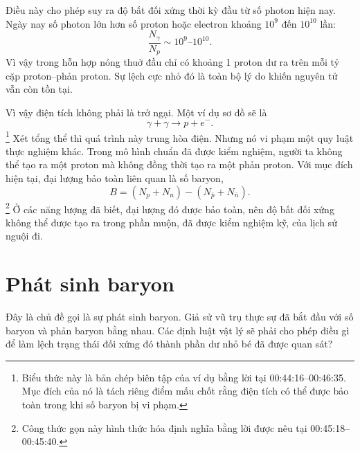 Điều này cho phép suy ra độ bất đối xứng thời kỳ đầu từ số photon hiện nay. Ngày nay số photon lớn hơn số proton hoặc electron khoảng \(10^9\) đến \(10^{10}\) lần:
\[
\frac{N_\gamma}{N_p} \sim 10^9\text{--}10^{10}.
\]
Vì vậy trong hỗn hợp nóng thuở đầu chỉ có khoảng 1 proton dư ra trên mỗi tỷ cặp proton--phản proton. Sự lệch cực nhỏ đó là toàn bộ lý do khiến nguyên tử vẫn còn tồn tại.

\begin{classroomqa}
\end{classroomqa}

Vì vậy điện tích không phải là trở ngại. Một ví dụ sơ đồ sẽ là
\[
\gamma + \gamma \to p + e^-.
\]\footnote{Biểu thức này là bản chép biên tập của ví dụ bằng lời tại 00:44:16--00:46:35. Mục đích của nó là tách riêng điểm mấu chốt rằng điện tích có thể được bảo toàn trong khi số baryon bị vi phạm.}
Xét tổng thể thì quá trình này trung hòa điện. Nhưng nó vi phạm một quy luật thực nghiệm khác. Trong mô hình chuẩn đã được kiểm nghiệm, người ta không thể tạo ra một proton mà không đồng thời tạo ra một phản proton. Với mục đích hiện tại, đại lượng bảo toàn liên quan là số baryon,
\[
B=(N_p+N_n)-(N_{\bar p}+N_{\bar n}).
\]\footnote{Công thức gọn này hình thức hóa định nghĩa bằng lời được nêu tại 00:45:18--00:45:40.}
Ở các năng lượng đã biết, đại lượng đó được bảo toàn, nên độ bất đối xứng không thể được tạo ra trong phần muộn, đã được kiểm nghiệm kỹ, của lịch sử nguội đi.

\section{Phát sinh baryon}

Đây là chủ đề gọi là sự phát sinh baryon. Giả sử vũ trụ thực sự đã bắt đầu với số baryon và phản baryon bằng nhau. Các định luật vật lý sẽ phải cho phép điều gì để làm lệch trạng thái đối xứng đó thành phần dư nhỏ bé đã được quan sát?

